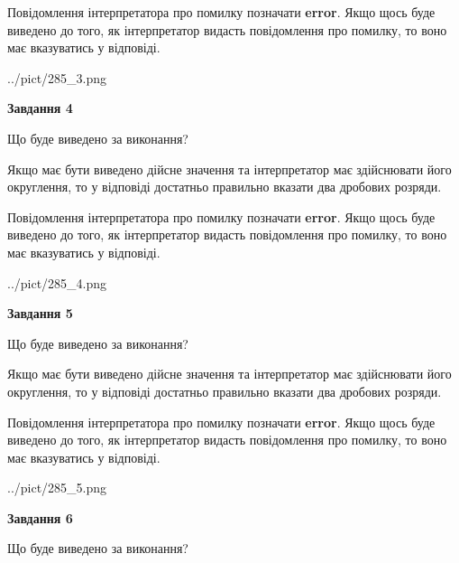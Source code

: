 \documentclass[12pt, ukrainian]{article}
\begin{document}
{\begin {Large}
Повідомлення інтерпретатора про помилку позначати \textbf{error}.
Якщо щось буде виведено до того, як інтерпретатор видасть повідомлення про помилку, 
то воно має вказуватись у відповіді. \par

\begin{center}
	{../pict/285_3.png}
\end{center}
\newpage

{\begin {center}\textbf{Завдання 4}\end {center}}\par
Що буде виведено за виконання? \par

Якщо має бути виведено дійсне значення та інтерпретатор має здійснювати його округлення, 
то у відповіді достатньо правильно вказати два дробових розряди.

Повідомлення інтерпретатора про помилку позначати \textbf{error}.
Якщо щось буде виведено до того, як інтерпретатор видасть повідомлення про помилку, 
то воно має вказуватись у відповіді. \par

\begin{center}
	{../pict/285_4.png}
\end{center}
\newpage

{\begin {center}\textbf{Завдання 5}\end {center}}\par
Що буде виведено за виконання? \par

Якщо має бути виведено дійсне значення та інтерпретатор має здійснювати його округлення, 
то у відповіді достатньо правильно вказати два дробових розряди.

Повідомлення інтерпретатора про помилку позначати \textbf{error}.
Якщо щось буде виведено до того, як інтерпретатор видасть повідомлення про помилку, 
то воно має вказуватись у відповіді. \par

\begin{center}
	{../pict/285_5.png}
\end{center}
\newpage

{\begin {center}\textbf{Завдання 6}\end {center}}\par
Що буде виведено за виконання? \par


\end{Large}}
\end{document}
